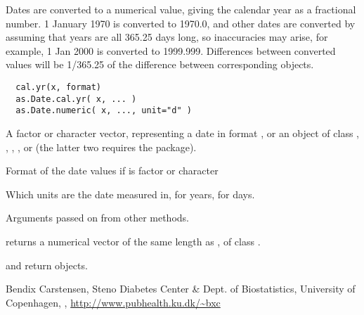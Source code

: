 \begin{Description}\relax
Dates are converted to a numerical value, giving the calendar year as
a fractional number. 1 January 1970 is converted to 1970.0, and other
dates are converted by assuming that years are all 365.25 days long,
so inaccuracies may arise, for example, 1 Jan 2000 is converted to
1999.999. Differences between converted values will be 1/365.25 of the 
difference between corresponding  objects.
\end{Description}
\begin{Usage}
\begin{verbatim}
  cal.yr(x, format)
  as.Date.cal.yr( x, ... )
  as.Date.numeric( x, ..., unit="d" )
\end{verbatim}
\end{Usage}
\begin{Arguments}
\begin{ldescription}
\item[\code{x}] A factor or character vector, representing a date in format
, or an object of class
,
,
,
,
 or
 (the latter two requires the  package).
\item[\code{format}] Format of the date values if  is factor or character
\item[\code{unit}] Which units are the date measured in,  for years,
 for days.
\item[\code{...}] Arguments passed on from other methods.
\end{ldescription}
\end{Arguments}
\begin{Value}
 returns a numerical vector of the same length as
, of class .

 and 
return  objects.
\end{Value}
\begin{Author}\relax
Bendix Carstensen, Steno Diabetes Center \& Dept. of Biostatistics,
University of Copenhagen, ,
\url{http://www.pubhealth.ku.dk/~bxc}
\end{Author}
